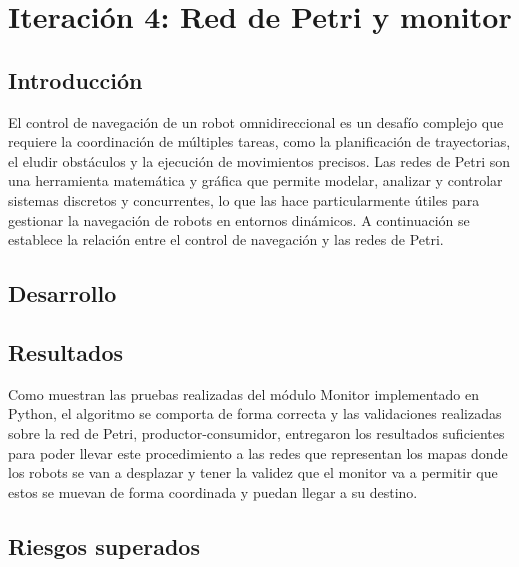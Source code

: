 \newpage
\section{Iteración 4: Red de Petri y monitor}

\subsection{Introducción}
El control de navegación de un robot omnidireccional es un desafío complejo que requiere la coordinación de múltiples tareas, como la planificación de trayectorias, el eludir obstáculos y la ejecución de movimientos precisos. Las redes de Petri son una herramienta matemática y gráfica que permite modelar, analizar y controlar sistemas discretos y concurrentes, lo que las hace particularmente útiles para gestionar la navegación de robots en entornos dinámicos. A continuación se establece la relación entre el control de navegación y las redes de Petri.



\subsection{Desarrollo}









\subsection{Resultados}
Como muestran las pruebas realizadas del módulo Monitor implementado en Python, el algoritmo se comporta de forma correcta y las validaciones realizadas sobre la red de Petri, productor-consumidor, entregaron los resultados suficientes para poder llevar este procedimiento a las redes que representan los mapas donde los robots se van a desplazar y tener la validez que el monitor va a permitir que estos se muevan de forma coordinada y puedan llegar a su destino.

\subsection{Riesgos superados}

